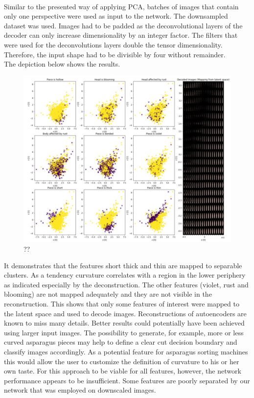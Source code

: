 \\
Similar to the presented way of applying PCA, batches of images that contain only one perspective were used as input to the network. The downsampled dataset was used. Images had to be padded as the deconvolutional layers of the decoder can only increase dimensionality by an integer factor. The filters that were used for the deconvolutions layers double the tensor dimensionality. Therefore, the input shape had to be divisible by four without remainder. \\
The depiction below shows the results. \\

\begin{figure}[h]
	\centering
	\includegraphics[scale=0.8]{Figures/chapter04/autoencoder}
	\decoRule
	\caption[??]{??}
	\label{fig:Autoencoder}
\end{figure}

It demonstrates that the features short thick and thin are mapped to separable clusters. As a tendency curvature correlates with a region in the lower periphery as indicated especially by the deconstruction. The other features (violet, rust and blooming) are not mapped adequately and they are not visible in the reconstruction. This shows that only some features of interest were mapped to the latent space and used to decode images. Reconstructions of autoencoders are known to miss many details. Better results could potentially have been achieved using larger input images. The possibility to generate, for example, more or less curved asparagus pieces may help to define a clear cut decision boundary and classify images accordingly. As a potential feature for asparagus sorting machines this would allow the user to customize the definition of curvature to his or her own taste. For this approach to be viable for all features, however, the network performance appears to be insufficient. Some features are poorly separated by our network that was employed on downscaled images.


